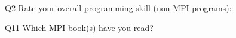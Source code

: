 \begin{description}%
\item{Q2} Rate your overall programming skill (non-MPI programs):%
\item{Q11} Which MPI book(s) have you read?%
\end{description}%
